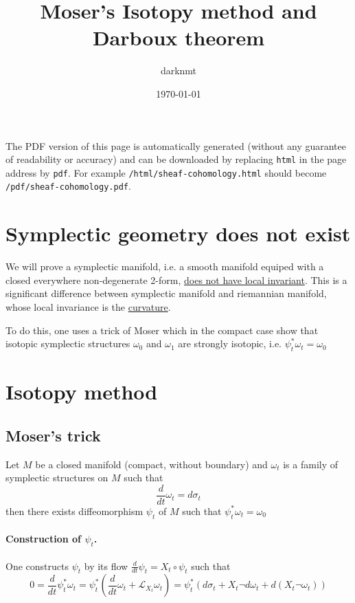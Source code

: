 \documentclass[11pt]{article}
\author{darknmt}
\date{\today}
\title{Moser's Isotopy method and Darboux theorem}
\begin{document}
\maketitle
\tableofcontents

\begin{info}
The PDF version of this page is automatically generated (without any guarantee of
readability or accuracy) and can be downloaded by replacing \texttt{html} in the page address by
\texttt{pdf}. 
For example \texttt{/html/sheaf-cohomology.html} should become \texttt{/pdf/sheaf-cohomology.pdf}.
\end{info}

\section{Symplectic geometry does not exist}
\label{sec:org3316df4}
We will prove a symplectic manifold, i.e. a smooth manifold equiped with a closed
everywhere non-degenerate 2-form, \uline{does not have local invariant}. This is a significant
difference between symplectic manifold and riemannian manifold, whose local invariance is
the \uline{curvature}.

To do this, one uses a trick of Moser which in the compact case show that isotopic
symplectic structures \(\omega_0\) and \(\omega_1\) are strongly isotopic, i.e. \(\psi_t^* \omega_t = \omega_0\)
\section{Isotopy method}
\label{sec:orgeb2e2ed}
\subsection{Moser's trick}
\label{sec:org5832dcd}
Let \(M\) be a closed manifold (compact, without boundary) and \(\omega_t\) is a family of
symplectic structures on \(M\) such that
\[
\frac{d}{dt}\omega_t = d\sigma_t
\]
then there exists diffeomorphism \(\psi_t\) of \(M\) such that \(\psi_t^* \omega_t = \omega_0\)


\paragraph{Construction of \(\psi_t\).}
\label{sec:org551d75e}
One constructs \(\psi_t\) by its flow \(\frac{d}{dt}\psi_t = X_t \circ \psi_t\) such that
\[
0 = \frac{d}{dt}\psi_t^*\omega_t = \psi_t^* \left(\frac{d}{dt} \omega_t +
\mathcal{L}_{X_t}\omega_t\right) = \psi_t^* \left( d\sigma_t + X_t \neg d\omega_t + d(X_t
\neg \omega_t) \right)
\]
\end{document}
